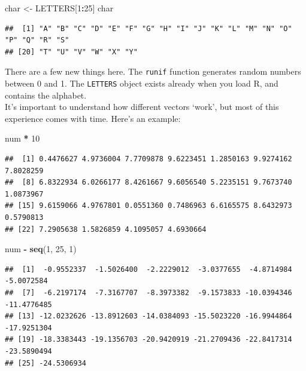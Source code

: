 \documentclass[
]{book}
\newenvironment{Shaded}{\begin{snugshade}}{\end{snugshade}}
\newcommand{\DecValTok}[1]{\textcolor[rgb]{0.00,0.00,0.81}{#1}}
\newcommand{\KeywordTok}[1]{\textcolor[rgb]{0.13,0.29,0.53}{\textbf{#1}}}
\newcommand{\NormalTok}[1]{#1}
\newcommand{\OperatorTok}[1]{\textcolor[rgb]{0.81,0.36,0.00}{\textbf{#1}}}
\newcommand{\StringTok}[1]{\textcolor[rgb]{0.31,0.60,0.02}{#1}}
\begin{document}
\begin{Shaded}
\begin{Highlighting}[]
\NormalTok{char <-}\StringTok{ }\NormalTok{LETTERS[}\DecValTok{1}\OperatorTok{:}\DecValTok{25}\NormalTok{]}
\NormalTok{char}
\end{Highlighting}
\end{Shaded}

\begin{verbatim}
##  [1] "A" "B" "C" "D" "E" "F" "G" "H" "I" "J" "K" "L" "M" "N" "O" "P" "Q" "R" "S"
## [20] "T" "U" "V" "W" "X" "Y"
\end{verbatim}

There are a few new things here. The \texttt{runif} function generates random numbers
between 0 and 1. The \texttt{LETTERS} object exists already when you load R, and
contains the alphabet.\\

It's important to understand how different vectors `work', but most of this
experience comes with time. Here's an example:

\begin{Shaded}
\begin{Highlighting}[]
\NormalTok{num }\OperatorTok{*}\StringTok{ }\DecValTok{10}
\end{Highlighting}
\end{Shaded}

\begin{verbatim}
##  [1] 0.4476627 4.9736004 7.7709878 9.6223451 1.2850163 9.9274162 7.8028259
##  [8] 6.8322934 6.0266177 8.4261667 9.6056540 5.2235151 9.7673740 1.0873967
## [15] 9.6159066 4.9767801 0.0551360 0.7486963 6.6165575 8.6432973 0.5790813
## [22] 7.2905638 1.5826859 4.1095057 4.6930664
\end{verbatim}

\begin{Shaded}
\begin{Highlighting}[]
\NormalTok{num }\OperatorTok{-}\StringTok{ }\KeywordTok{seq}\NormalTok{(}\DecValTok{1}\NormalTok{, }\DecValTok{25}\NormalTok{, }\DecValTok{1}\NormalTok{)}
\end{Highlighting}
\end{Shaded}

\begin{verbatim}
##  [1]  -0.9552337  -1.5026400  -2.2229012  -3.0377655  -4.8714984  -5.0072584
##  [7]  -6.2197174  -7.3167707  -8.3973382  -9.1573833 -10.0394346 -11.4776485
## [13] -12.0232626 -13.8912603 -14.0384093 -15.5023220 -16.9944864 -17.9251304
## [19] -18.3383443 -19.1356703 -20.9420919 -21.2709436 -22.8417314 -23.5890494
## [25] -24.5306934
\end{verbatim}
\end{document}
